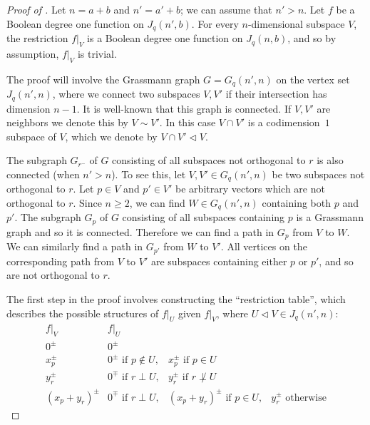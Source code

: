 \documentclass{article}
\theoremstyle{definition}
\providecommand{\subs}{\triangleleft}
\begin{document}
\begin{proof}[Proof of ]
Let $n = a+b$ and $n' = a'+b$; we can assume that $n' > n$. Let $f$ be a Boolean degree one function on $J_q(n',b)$. For every $n$-dimensional subspace $V$, the restriction $f|_V$ is a Boolean degree one function on $J_q(n,b)$, and so by assumption, $f|_V$ is trivial.

The proof will involve the Grassmann graph $G = G_q(n',n)$ on the vertex set $J_q(n',n)$, where we connect two subspaces $V,V'$ if their intersection has dimension $n-1$. It is well-known that this graph is connected. If $V,V'$ are neighbors we denote this by $V \sim V'$.
In this case $V \cap V'$ is a codimension~$1$ subspace of $V$, which we denote by $V \cap V' \subs V$.

The subgraph $G_{r^-}$ of $G$ consisting of all subspaces not orthogonal to $r$ is also connected (when $n' > n$). To see this, let $V,V' \in G_q(n',n)$ be two subspaces not orthogonal to $r$. Let $p \in V$ and $p' \in V'$ be arbitrary vectors which are not orthogonal to $r$. Since $n \ge 2$, we can find $W \in G_q(n',n)$ containing both $p$ and $p'$. The subgraph $G_p$ of $G$ consisting of all subspaces containing $p$ is a Grassmann graph and so it is connected. Therefore we can find a path in $G_p$ from $V$ to $W$. We can similarly find a path in $G_{p'}$ from $W$ to $V'$. All vertices on the corresponding path from $V$ to $V'$ are subspaces containing either $p$ or $p'$, and so are not orthogonal to $r$.

\smallskip

The first step in the proof involves constructing the ``restriction table'', which describes the possible structures of $f|_U$ given $f|_V$, where $U \subs V \in J_q(n',n)$:
\[
\begin{array}{c|lll}
f|_V & f|_U \\\hline
0^\pm & 0^\pm \\
x_p^\pm & 0^\pm \text{ if } p \notin U, & x_p^\pm \text{ if } p \in U \\
y_r^\pm & 0^\mp \text{ if } r \perp U, & y_r^\pm \text{ if } r \not\perp U \\
(x_p+y_r)^\pm & 0^\mp \text{ if } r \perp U, & (x_p+y_r)^\pm \text{ if } p \in U, & y_r^\pm \text{ otherwise} 
\end{array}
\]



\end{proof}
\end{document}
